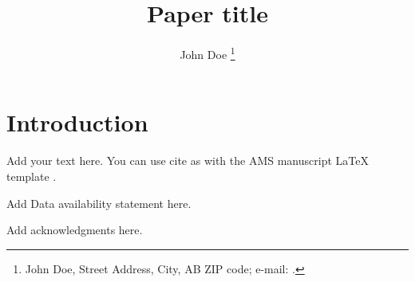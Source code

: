 \documentclass[9pt]{amsextabs}
\title{Paper title}
\author{John Doe
        \thanks{\noindent{\itshape Corresponding author address:}
        John Doe, Street Address, City, AB ZIP code;
        e-mail: \href{mailto:}{}.}
}
\affiliation{Affiliations}
\begin{document}
\maketitle
\section{Introduction}
Add your text here. You can use cite as with the AMS manuscript LaTeX
template \citep[e.g.,][]{Eliassen1951}.

%
\datastatement
Add Data availability statement here.

%
\acknowledgments
Add acknowledgments here.



\end{document}
